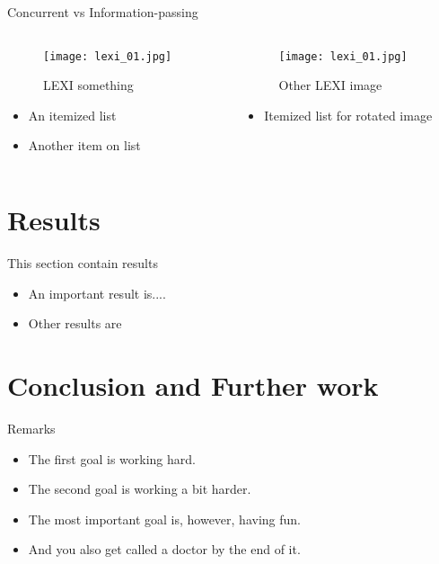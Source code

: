 \documentclass[10pt,xcolor=table]{beamer}
\begin{document}
\begin{frame}{Concurrent vs Information-passing}
    \begin{columns}
        \begin{column}{0.5\textwidth}
            \begin{figure}
                \texttt{[image: lexi\_01.jpg]}
                \caption{LEXI something}
            \end{figure}
            \begin{itemize}
                \item An itemized list
                \item Another item on list
            \end{itemize}
        \end{column}
        \begin{column}{0.5\textwidth}
            \begin{figure}
                \texttt{[image: lexi\_01.jpg]}
                \caption{Other LEXI image}
            \end{figure}
            \begin{itemize}
                \item Itemized list for rotated image
            \end{itemize}
        \end{column}
        \vspace{0.25cm}
    \end{columns}
\end{frame}


\section{Results}
\begin{frame}{This section contain results}
    \begin{itemize}
        \item An important result is....
        \item Other results are 
    \end{itemize}  
\end{frame}

\section{Conclusion and Further work}
\begin{frame}{Remarks}
    \begin{itemize}
        \item The first goal is working hard.
        \item The second goal is working a bit harder.
        \item The most important goal is, however, having fun.
        \item And you also get called a doctor by the end of it.
    \end{itemize}
\end{frame}
\end{document}
